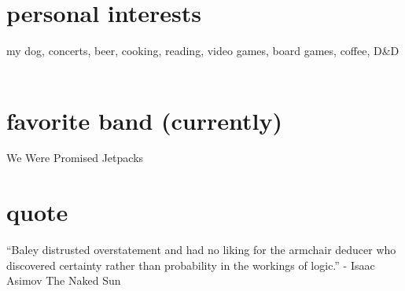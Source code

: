
\begin{aside} %
\section{personal interests}
my dog, concerts, beer, cooking, reading, video games, board games, coffee, D\&D
~
\section{favorite band (currently)}
We Were Promised Jetpacks
~
\section{quote}
“Baley distrusted overstatement and had no liking for the armchair deducer who discovered certainty rather than probability in the workings of logic.” - Isaac Asimov The Naked Sun
~
\end{aside}

